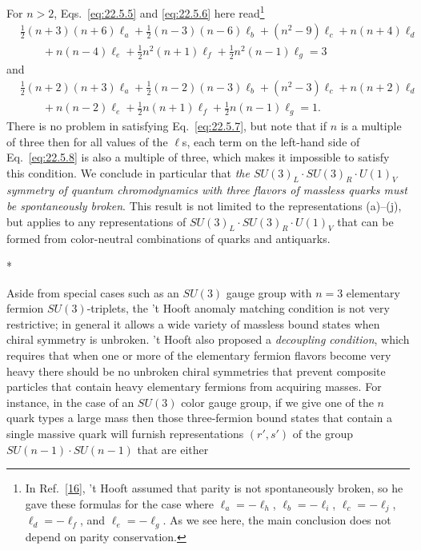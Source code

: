 For $n>2$, Eqs.~\eqref{eq:22.5.5} and \eqref{eq:22.5.6} here
read\footnote{In Ref.~\hyperref[ch22-ref-16]{[16]}, 't Hooft assumed that
parity is not spontaneously broken, so he gave these formulas for the case
where $\ell_a=-\ell_h$, $\ell_b=-\ell_i$, $\ell_c=-\ell_j$,
$\ell_d=-\ell_f$, and $\ell_e=-\ell_g$. As we see here, the main
conclusion does not depend on parity conservation.}
\begin{equation}
 \begin{aligned}
 &\frac{1}{2}(n+3)(n+6)\ell_a
 +\frac{1}{2}(n-3)(n-6)\ell_b
 +(n^2-9)\ell_c+n(n+4)\ell_d\\
 &\qquad
 +n(n-4)\ell_e
 +\frac{1}{2}n^2(n+1)\ell_f
 +\frac{1}{2}n^2(n-1)\ell_g=3
 \end{aligned}
 \tag{22.5.7}\label{eq:22.5.7}
\end{equation}
and
\begin{equation}
 \begin{aligned}
 &\frac{1}{2}(n+2)(n+3)\ell_a
 +\frac{1}{2}(n-2)(n-3)\ell_b
 +(n^2-3)\ell_c+n(n+2)\ell_d\\
 &\qquad
 +n(n-2)\ell_e
 +\frac{1}{2}n(n+1)\ell_f
 +\frac{1}{2}n(n-1)\ell_g=1.
 \end{aligned}
 \tag{22.5.8}\label{eq:22.5.8}
\end{equation}
There is no problem in satisfying Eq.~\eqref{eq:22.5.7}, but note that if
$n$ is a multiple of three then for all values of the $\ell$s, each term
on the left-hand side of Eq.~\eqref{eq:22.5.8} is also a multiple of three,
which makes it impossible to satisfy this condition. We conclude in
particular that \emph{the $SU(3)_L\cdot SU(3)_R\cdot U(1)_V$ symmetry of
quantum chromodynamics with three flavors of massless quarks must be
spontaneously broken}. This result is not limited to the representations
(a)--(j), but applies to any representations of
$SU(3)_L\cdot SU(3)_R\cdot U(1)_V$ that can be formed from color-neutral
combinations of quarks and antiquarks.

\begin{center}
* \quad * \quad *
\end{center}

Aside from special cases such as an $SU(3)$ gauge group with $n=3$
elementary fermion $SU(3)$-triplets, the 't Hooft anomaly matching
condition is not very restrictive; in general it allows a wide variety of
massless bound states when chiral symmetry is unbroken. 't Hooft also
proposed a \emph{decoupling condition}, which requires that when one or
more of the elementary fermion flavors become very heavy there should be
no unbroken chiral symmetries that prevent composite particles that contain
heavy elementary fermions from acquiring masses. For instance, in the case
of an $SU(3)$ color gauge group, if we give one of the $n$ quark types a
large mass then those three-fermion bound states that contain a single
massive quark will furnish representations $(r',s')$ of the group
$SU(n-1)\cdot SU(n-1)$ that are either

